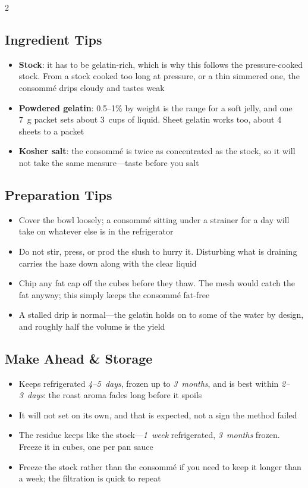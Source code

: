 \documentclass[11pt,letterpaper]{article}
\begin{document}
{\begin{multicols}{2}
\subsection*{Ingredient Tips}
\begin{itemize}
    \item \textbf{Stock}: it has to be gelatin-rich, which is why this follows the pressure-cooked stock. From a stock cooked too long at pressure, or a thin simmered one, the consomm\'e drips cloudy and tastes weak
    \item \textbf{Powdered gelatin}: 0.5--1\% by weight is the range for a soft jelly, and one 7~g packet sets about 3~cups of liquid. Sheet gelatin works too, about 4 sheets to a packet
    \item \textbf{Kosher salt}: the consomm\'e is twice as concentrated as the stock, so it will not take the same measure---taste before you salt
\end{itemize}

\subsection*{Preparation Tips}
\begin{itemize}
    \item Cover the bowl loosely; a consomm\'e sitting under a strainer for a day will take on whatever else is in the refrigerator
    \item Do not stir, press, or prod the slush to hurry it. Disturbing what is draining carries the haze down along with the clear liquid
    \item Chip any fat cap off the cubes before they thaw. The mesh would catch the fat anyway; this simply keeps the consomm\'e fat-free
    \item A stalled drip is normal---the gelatin holds on to some of the water by design, and roughly half the volume is the yield
\end{itemize}

\subsection*{Make Ahead \& Storage}
\begin{itemize}
    \item Keeps refrigerated \textit{4--5~days}, frozen up to \textit{3~months}, and is best within \textit{2--3~days}: the roast aroma fades long before it spoils
    \item It will not set on its own, and that is expected, not a sign the method failed
    \item The residue keeps like the stock---\textit{1~week} refrigerated, \textit{3~months} frozen. Freeze it in cubes, one per pan sauce
    \item Freeze the stock rather than the consomm\'e if you need to keep it longer than a week; the filtration is quick to repeat
\end{itemize}


\end{multicols}}
\end{document}
